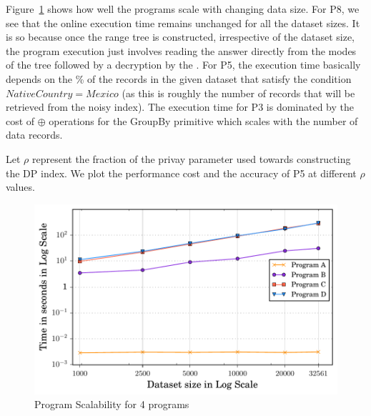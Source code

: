  Figure~\ref{fig:scale} shows how well the \system programs scale with changing data size. For P8, we see that the online execution time remains unchanged for all the dataset sizes. It is so because once the range tree is constructed, irrespective of the dataset size, the program execution just involves reading the answer directly from the modes of the tree followed by a decryption by the \CPS. For P5, the execution time basically depends on the \% of the records in the given dataset that satisfy the condition $NativeCountry=Mexico$ (as this is roughly the number of records that will be retrieved from the noisy index).  The execution time for P3 is dominated by the cost of $\oplus$ operations for the \textsf{GroupBy} primitive which scales with the number of data records. 


   Let $\rho$ represent the fraction of the privay parameter used towards constructing the DP index. We plot the performance cost and the accuracy of P5 at different $\rho$ values.


\begin{figure}[b]
     \includegraphics[width=0.6\columnwidth]{scale_final.pdf}
        \caption{\system Program Scalability for 4 programs}\label{fig:scale}
\end{figure}

